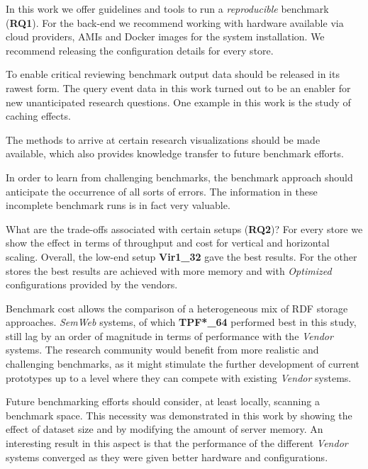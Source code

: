 
In this work we offer guidelines and tools to run a \emph{reproducible} benchmark (\textbf{RQ1}). For the back-end we recommend working with hardware available via cloud providers, AMIs and Docker images for the system installation. We recommend releasing the configuration details for every store. 

To enable critical reviewing benchmark output data should be released in its rawest form. The  query event data in this work turned out to be an enabler for new unanticipated research questions. One example in this work is the study of caching effects. 

The methods to arrive at certain research visualizations should be made available, which also provides knowledge transfer to future benchmark efforts. 

In order to learn from challenging benchmarks, the benchmark approach should anticipate the occurrence of all sorts of errors. The information in these incomplete benchmark runs is in fact very valuable. 

What are the trade-offs associated with certain setups (\textbf{RQ2})? For every store we show the effect in terms of throughput and cost for vertical and horizontal scaling. 
Overall, the low-end setup \textbf{Vir1\_32} gave the best results. For the other stores the best results are achieved with more memory and with \emph{Optimized} configurations provided by the vendors.

Benchmark cost allows the comparison of a heterogeneous mix of RDF storage approaches. \emph{SemWeb} systems, of which \textbf{TPF*\_64} performed best in this study, still lag by an order of magnitude in terms of performance with the \emph{Vendor} systems. The research community would benefit from more realistic and challenging benchmarks, as it might stimulate the further development of current prototypes up to a level where they can compete with existing \emph{Vendor} systems.

Future benchmarking efforts should consider, at least locally, scanning a benchmark space. This necessity was demonstrated in this work by showing the effect of dataset size and by modifying the amount of server memory. An interesting result in this aspect is that the performance of the different \emph{Vendor} systems converged as they were given better hardware and configurations.

